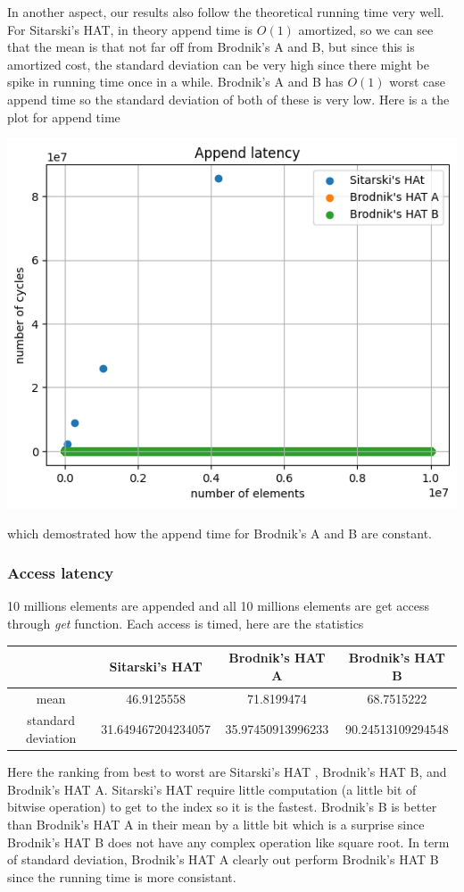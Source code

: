\documentclass{article} %
\begin{document}
    In another aspect, our results also follow the theoretical running time very well. For Sitarski's HAT, in theory append time is $O(1)$ amortized, so we can see that the mean
    is that not far off from Brodnik's A and B, but since this is amortized cost, the standard deviation can be very high since there might be spike in running time once in a while. Brodnik's A and B has $O(1)$ worst case append time so
    the standard deviation of both of these is very low. Here is a the plot for append time
    \begin{center}
        \includegraphics{graphics/hat_append.png}
    \end{center}
    which demostrated how the append time for Brodnik's A and B are constant.
    \subsubsection*{Access latency}
    10 millions elements are appended and all 10 millions elements are get access through \emph{get} function.
    Each access is timed, here are the statistics
    \begin{center}
        \begin{tabular}{|c|c|c|c|}\hline
        & Sitarski's HAT & Brodnik's HAT A & Brodnik's HAT B\\\hline
        mean &  46.9125558 & 71.8199474 & 68.7515222\\\hline
        standard deviation & 31.649467204234057  & 35.97450913996233 & 90.24513109294548\\\hline
        \end{tabular}
    \end{center}
    Here the ranking from best to worst are Sitarski's HAT , Brodnik's HAT B, and Brodnik's HAT A. Sitarski's HAT require little
    computation (a little bit of bitwise operation) to get to the index so it is the fastest. Brodnik's B is better than Brodnik's HAT A in
    their mean by a little bit which is a surprise since Brodnik's HAT B does not have any complex operation like square root. In term of standard deviation,
    Brodnik's HAT A clearly out perform Brodnik's HAT B since the running time is more consistant.
\end{document}
